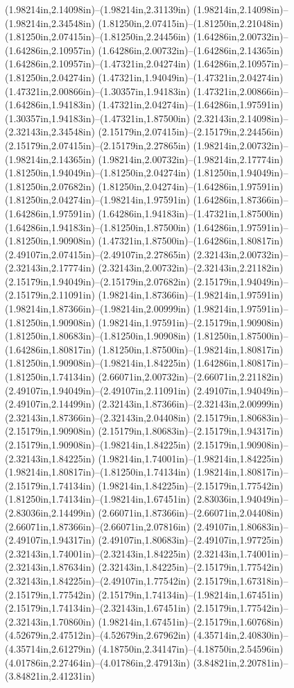 (1.98214in,2.14098in)--(1.98214in,2.31139in) (1.98214in,2.14098in)--(1.98214in,2.34548in) (1.81250in,2.07415in)--(1.81250in,2.21048in) (1.81250in,2.07415in)--(1.81250in,2.24456in) (1.64286in,2.00732in)--(1.64286in,2.10957in) (1.64286in,2.00732in)--(1.64286in,2.14365in) (1.64286in,2.10957in)--(1.47321in,2.04274in) (1.64286in,2.10957in)--(1.81250in,2.04274in) (1.47321in,1.94049in)--(1.47321in,2.04274in) (1.47321in,2.00866in)--(1.30357in,1.94183in) (1.47321in,2.00866in)--(1.64286in,1.94183in) (1.47321in,2.04274in)--(1.64286in,1.97591in) (1.30357in,1.94183in)--(1.47321in,1.87500in) (2.32143in,2.14098in)--(2.32143in,2.34548in) (2.15179in,2.07415in)--(2.15179in,2.24456in) (2.15179in,2.07415in)--(2.15179in,2.27865in) (1.98214in,2.00732in)--(1.98214in,2.14365in) (1.98214in,2.00732in)--(1.98214in,2.17774in) (1.81250in,1.94049in)--(1.81250in,2.04274in) (1.81250in,1.94049in)--(1.81250in,2.07682in) (1.81250in,2.04274in)--(1.64286in,1.97591in) (1.81250in,2.04274in)--(1.98214in,1.97591in) (1.64286in,1.87366in)--(1.64286in,1.97591in) (1.64286in,1.94183in)--(1.47321in,1.87500in) (1.64286in,1.94183in)--(1.81250in,1.87500in) (1.64286in,1.97591in)--(1.81250in,1.90908in) (1.47321in,1.87500in)--(1.64286in,1.80817in) (2.49107in,2.07415in)--(2.49107in,2.27865in) (2.32143in,2.00732in)--(2.32143in,2.17774in) (2.32143in,2.00732in)--(2.32143in,2.21182in) (2.15179in,1.94049in)--(2.15179in,2.07682in) (2.15179in,1.94049in)--(2.15179in,2.11091in) (1.98214in,1.87366in)--(1.98214in,1.97591in) (1.98214in,1.87366in)--(1.98214in,2.00999in) (1.98214in,1.97591in)--(1.81250in,1.90908in) (1.98214in,1.97591in)--(2.15179in,1.90908in) (1.81250in,1.80683in)--(1.81250in,1.90908in) (1.81250in,1.87500in)--(1.64286in,1.80817in) (1.81250in,1.87500in)--(1.98214in,1.80817in) (1.81250in,1.90908in)--(1.98214in,1.84225in) (1.64286in,1.80817in)--(1.81250in,1.74134in) (2.66071in,2.00732in)--(2.66071in,2.21182in) (2.49107in,1.94049in)--(2.49107in,2.11091in) (2.49107in,1.94049in)--(2.49107in,2.14499in) (2.32143in,1.87366in)--(2.32143in,2.00999in) (2.32143in,1.87366in)--(2.32143in,2.04408in) (2.15179in,1.80683in)--(2.15179in,1.90908in) (2.15179in,1.80683in)--(2.15179in,1.94317in) (2.15179in,1.90908in)--(1.98214in,1.84225in) (2.15179in,1.90908in)--(2.32143in,1.84225in) (1.98214in,1.74001in)--(1.98214in,1.84225in) (1.98214in,1.80817in)--(1.81250in,1.74134in) (1.98214in,1.80817in)--(2.15179in,1.74134in) (1.98214in,1.84225in)--(2.15179in,1.77542in) (1.81250in,1.74134in)--(1.98214in,1.67451in) (2.83036in,1.94049in)--(2.83036in,2.14499in) (2.66071in,1.87366in)--(2.66071in,2.04408in) (2.66071in,1.87366in)--(2.66071in,2.07816in) (2.49107in,1.80683in)--(2.49107in,1.94317in) (2.49107in,1.80683in)--(2.49107in,1.97725in) (2.32143in,1.74001in)--(2.32143in,1.84225in) (2.32143in,1.74001in)--(2.32143in,1.87634in) (2.32143in,1.84225in)--(2.15179in,1.77542in) (2.32143in,1.84225in)--(2.49107in,1.77542in) (2.15179in,1.67318in)--(2.15179in,1.77542in) (2.15179in,1.74134in)--(1.98214in,1.67451in) (2.15179in,1.74134in)--(2.32143in,1.67451in) (2.15179in,1.77542in)--(2.32143in,1.70860in) (1.98214in,1.67451in)--(2.15179in,1.60768in) (4.52679in,2.47512in)--(4.52679in,2.67962in) (4.35714in,2.40830in)--(4.35714in,2.61279in) (4.18750in,2.34147in)--(4.18750in,2.54596in) (4.01786in,2.27464in)--(4.01786in,2.47913in) (3.84821in,2.20781in)--(3.84821in,2.41231in) 